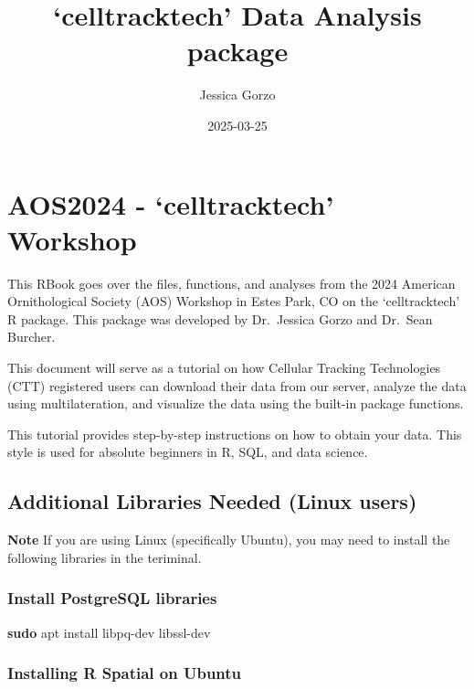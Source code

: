 \documentclass[
]{book}
\title{`celltracktech' Data Analysis package}
\author{Jessica Gorzo}
\date{2025-03-25}
\newenvironment{Shaded}{\begin{snugshade}}{\end{snugshade}}
\newcommand{\FunctionTok}[1]{\textcolor[rgb]{0.13,0.29,0.53}{\textbf{#1}}}
\newcommand{\NormalTok}[1]{#1}
\begin{document}
\maketitle

{
\setcounter{tocdepth}{1}
\tableofcontents
}
\chapter{AOS2024 - `celltracktech' Workshop}\label{aos2024---celltracktech-workshop}

This RBook goes over the files, functions, and analyses from the 2024 American Ornithological Society (AOS) Workshop in Estes Park, CO on the `celltracktech' R package. This package was developed by Dr.~Jessica Gorzo and Dr.~Sean Burcher.

This document will serve as a tutorial on how Cellular Tracking Technologies (CTT) registered users can download their data from our server, analyze the data using multilateration, and visualize the data using the built-in package functions.

This tutorial provides step-by-step instructions on how to obtain your data. This style is used for absolute beginners in R, SQL, and data science.

\section{Additional Libraries Needed (Linux users)}\label{additional-libraries-needed-linux-users}

\textbf{Note} If you are using Linux (specifically Ubuntu), you may need to install the following libraries in the teriminal.

\subsection{Install PostgreSQL libraries}\label{install-postgresql-libraries}

\begin{Shaded}
\begin{Highlighting}[]
\FunctionTok{sudo}\NormalTok{ apt install libpq{-}dev libssl{-}dev}
\end{Highlighting}
\end{Shaded}

\subsection{Installing R Spatial on Ubuntu}\label{installing-r-spatial-on-ubuntu}
\end{document}
